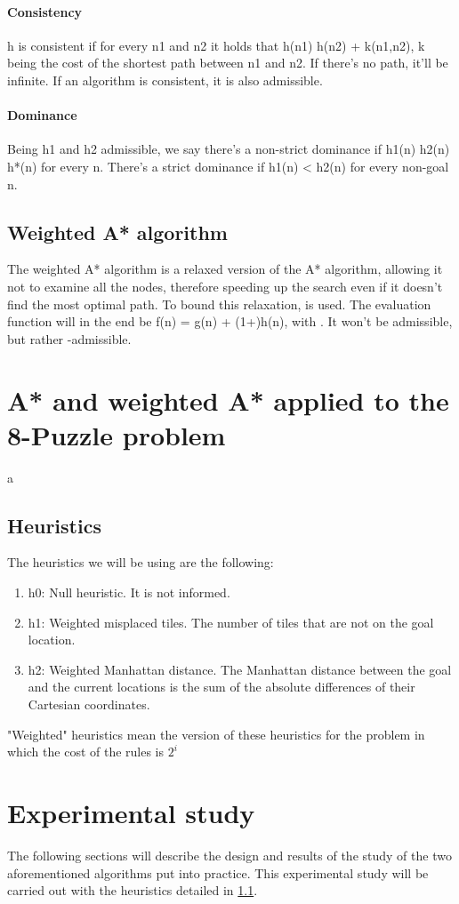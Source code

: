\documentclass[runningheads]{llncs}
\begin{document}
\paragraph{Consistency}
h is consistent if for every n1 and n2 it holds that h(n1) \leq h(n2) + k(n1,n2), k being the cost of the shortest path between n1 and n2. If there's no path, it'll be infinite. If an algorithm is consistent, it is also admissible.
\paragraph{Dominance}
Being h1 and h2 admissible, we say there's a non-strict dominance if h1(n) \leq h2(n) \leq h*(n) for every n.
There's a strict dominance if h1(n) < h2(n) for every non-goal n.
\subsection{Weighted A* algorithm}
The weighted A* algorithm is a relaxed version of the A* algorithm, allowing it not to examine all the nodes, therefore speeding up the search even if it doesn't find the most optimal path. To bound this relaxation, \epsilon is used. The evaluation function will in the end be f(n) = g(n) + (1+\epsilon)h(n), with \epsilon {}. It won't be admissible, but rather \epsilon-admissible.

\section{A* and weighted A* applied to the 8-Puzzle problem} \label{s:awa8p}
a
\subsection{Heuristics}\label{ss:heuristics}
The heuristics we will be using are the following:
\begin{enumerate}
\item h0: Null heuristic. It is not informed.
\item h1: Weighted misplaced tiles. The number of tiles that are not on the goal location.
\item h2: Weighted Manhattan distance. The Manhattan distance between the goal and the current locations is the sum of the absolute differences of their Cartesian coordinates.
\end{enumerate}
"Weighted" heuristics mean the version of these heuristics for the problem in which the cost of the rules is \(2^i\)

\section{Experimental study}
The following sections will describe the design and results of the study of the two aforementioned algorithms put into practice. This experimental study will be carried out with the heuristics detailed in \ref{ss:heuristics}.
\end{document}
